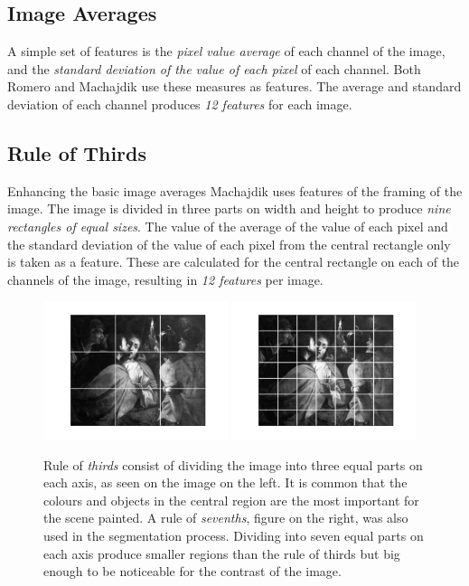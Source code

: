 \documentclass[11pt,a4paper,twoside,openright,draft]{report}
\begin{document}
\begin{multicols}{2}
\subsection{Image Averages}

A simple set of features is the \emph{pixel value average} of each channel of
the image, and the \emph{standard deviation of the value of each pixel} of each
channel.  Both Romero \cite{jma12clas} and Machajdik \cite{mach10clas} use
these measures as features.  The average and standard deviation of each channel
produces \emph{12 features} for each image.

\subsection{Rule of Thirds}

Enhancing the basic image averages Machajdik \cite{mach10clas} uses features of
the framing of the image.  The image is divided in three parts on width and
height to produce \emph{nine rectangles of equal sizes}.  The value of the
average of the value of each pixel and the standard deviation of the value of
each pixel from the central rectangle only is taken as a feature.  These are
calculated for the central rectangle on each of the channels of the image,
resulting in \emph{12 features} per image.

\begin{figure}[tbp]
\centering
\includegraphics[width=0.48\textwidth]{r3_L_caravaggio_1962_139_1}
\includegraphics[width=0.48\textwidth]{r7_L_caravaggio_1962_139_1}
\caption[Rule of thirds]{Rule of \emph{thirds} consist of dividing the image
into three equal parts on each axis, as seen on the image on the left.  It is
common that the colours and objects in the central region are the most
important for the scene painted.  A rule of \emph{sevenths}, figure on the
right, was also used in the segmentation process.  Dividing into seven equal
parts on each axis produce smaller regions than the rule of thirds but big
enough to be noticeable for the contrast of the image.}
\label{fig:r3}
\end{figure}


\end{multicols}
\end{document}
